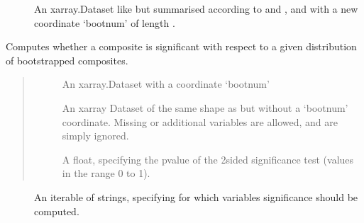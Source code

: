 \documentclass[letterpaper,10pt,english]{sphinxmanual}
\begin{document}
\begin{fulllineitems}
\begin{fulllineitems}
\begin{description}
\item[{}] \leavevmode
\sphinxAtStartPar
An xarray.Dataset like  but summarised according to  and , and with a new coordinate ‘bootnum’ of length .

\end{description}

\end{fulllineitems}


\begin{fulllineitems}
\label{\detokenize{docs/composites:composites.LaggedAnalyser.get_significance}}
\pysigstartsignatures
{}
\pysigstopsignatures
\sphinxAtStartPar
Computes whether a composite is significant with respect to a given distribution of bootstrapped composites.

\sphinxAtStartPar
{}
\begin{quote}
\begin{description}
\item[{}] \leavevmode
\sphinxAtStartPar
An xarray.Dataset with a coordinate ‘bootnum’

\item[{}] \leavevmode
\sphinxAtStartPar
An xarray Dataset of the same shape as  but without a ‘bootnum’ coordinate. Missing or additional variables are allowed, and are simply ignored.

\item[{}] \leavevmode
\sphinxAtStartPar
A float, specifying the p\sphinxhyphen{}value of the 2\sphinxhyphen{}sided significance test (values in the range 0 to 1).

\end{description}
\end{quote}

\sphinxAtStartPar
{}
\begin{description}
\item[{}] \leavevmode
\sphinxAtStartPar
An iterable of strings, specifying for which variables significance should be computed.


\end{description}
\end{fulllineitems}
\end{fulllineitems}
\end{document}
